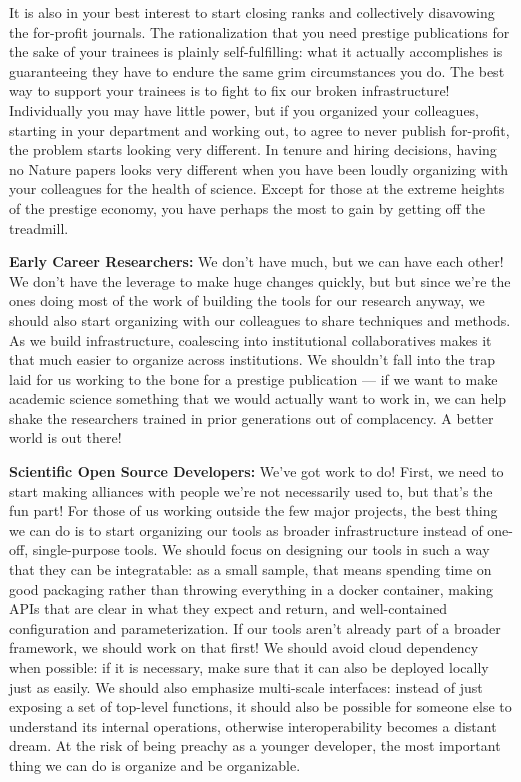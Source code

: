 It is also in your best interest to start closing ranks and collectively
disavowing the for-profit journals. The rationalization that you need
prestige publications for the sake of your trainees is plainly
self-fulfilling: what it actually accomplishes is guaranteeing they have
to endure the same grim circumstances you do. The best way to support
your trainees is to fight to fix our broken infrastructure! Individually
you may have little power, but if you organized your colleagues,
starting in your department and working out, to agree to never publish
for-profit, the problem starts looking very different. In tenure and
hiring decisions, having no Nature papers looks very different when you
have been loudly organizing with your colleagues for the health of
science. Except for those at the extreme heights of the prestige
economy, you have perhaps the most to gain by getting off the treadmill.

\textbf{Early Career Researchers:} We don't have much, but we can have
each other! We don't have the leverage to make huge changes quickly, but
but since we're the ones doing most of the work of building the tools
for our research anyway, we should also start organizing with our
colleagues to share techniques and methods. As we build infrastructure,
coalescing into institutional collaboratives makes it that much easier
to organize across institutions. We shouldn't fall into the trap laid
for us working to the bone for a prestige publication --- if we want to
make academic science something that we would actually want to work in,
we can help shake the researchers trained in prior generations out of
complacency. A better world is out there!

\textbf{Scientific Open Source Developers:} We've got work to do! First,
we need to start making alliances with people we're not necessarily used
to, but that's the fun part! For those of us working outside the few
major projects, the best thing we can do is to start organizing our
tools as broader infrastructure instead of one-off, single-purpose
tools. We should focus on designing our tools in such a way that they
can be integratable: as a small sample, that means spending time on good
packaging rather than throwing everything in a docker container, making
APIs that are clear in what they expect and return, and well-contained
configuration and parameterization. If our tools aren't already part of
a broader framework, we should work on that first! We should avoid cloud
dependency when possible: if it is necessary, make sure that it can also
be deployed locally just as easily. We should also emphasize multi-scale
interfaces: instead of just exposing a set of top-level functions, it
should also be possible for someone else to understand its internal
operations, otherwise interoperability becomes a distant dream. At the
risk of being preachy as a younger developer, the most important thing
we can do is organize and be organizable.

